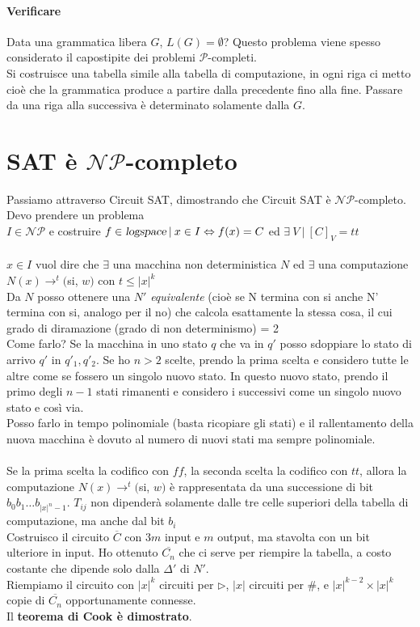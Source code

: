 \documentclass[10pt]{book}
\begin{document}
\paragraph{Verificare} Data una grammatica libera $G$, $L(G) = \emptyset$? Questo problema viene spesso considerato il capostipite dei problemi $\mathscr{P}$-completi.\\
Si costruisce una tabella simile alla tabella di computazione, in ogni riga ci metto  cioè che la grammatica produce a partire dalla precedente fino alla fine. Passare da una riga alla successiva è determinato solamente dalla $G$.
\section{SAT è $\mathscr{NP}$-completo}
Passiamo attraverso Circuit SAT, dimostrando che Circuit SAT è $\mathscr{NP}$-completo. Devo prendere un problema\\$I \in \mathscr{NP}$ e costruire $f\in\textsl{logspace}\:|\:x\in I\Leftrightarrow f(x) = C$ ed $\exists\:V\:|\:[C]_V = tt$\\\\
$x \in I$ vuol dire che $\exists$ una macchina non deterministica $N$ ed $\exists$ una computazione $N(x)\longrightarrow^t($si, $w)$ con $t\leq |x|^k$\\
Da $N$ posso ottenere una $N'$ \textit{equivalente} (cioè se N termina con si anche N' termina con si, analogo per il no) che calcola esattamente la stessa cosa, il cui grado di diramazione (grado di non determinismo) = 2\\
Come farlo? Se la macchina in uno stato $q$ che va in $q'$ posso sdoppiare lo stato di arrivo $q'$ in $q'_1, q'_2$. Se ho $n > 2$ scelte, prendo la prima scelta e considero tutte le altre come se fossero un singolo nuovo stato. In questo nuovo stato, prendo il primo degli $n-1$ stati rimanenti e considero i successivi come un singolo nuovo stato e così via.\\
Posso farlo in tempo polinomiale (basta ricopiare gli stati) e il rallentamento della nuova macchina è dovuto al numero di nuovi stati ma sempre polinomiale.\\\\
Se la prima scelta la codifico con $ff$, la seconda scelta la codifico con $tt$, allora la computazione $N(x)\longrightarrow^t($si, $w)$ è rappresentata da una successione di bit $b_0 b_1\ldots b_{|x|^n - 1}$. $T_{ij}$ non dipenderà solamente dalle tre celle superiori della tabella di computazione, ma anche dal bit $b_i$\\
Costruisco il circuito $\overline{C}$ con $3m$ input e $m$ output, ma stavolta con un bit ulteriore in input. Ho ottenuto $\overline{C_n}$ che ci serve per riempire la tabella, a costo costante che dipende solo dalla $\Delta'$ di $N'$.\\
Riempiamo il circuito con $|x|^k$ circuiti per $\triangleright$, $|x|$ circuiti per $\#$, e $|x|^{k-2}\times|x|^k$ copie di $\overline{C_n}$ opportunamente connesse.\\
Il \textbf{teorema di Cook è dimostrato}.
\end{document}
